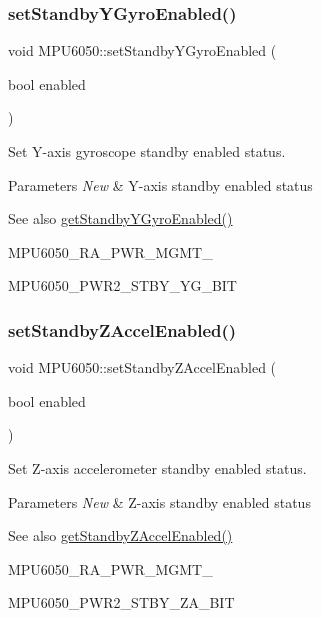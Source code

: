 \subsubsection{\texorpdfstring{setStandbyYGyroEnabled()}{setStandbyYGyroEnabled()}}
{\footnotesize\ttfamily void M\+P\+U6050\+::set\+Standby\+Y\+Gyro\+Enabled (\begin{DoxyParamCaption}\item[{bool}]{enabled }\end{DoxyParamCaption})}

Set Y-\/axis gyroscope standby enabled status. 
\begin{DoxyParams}{Parameters}
{\em New} & Y-\/axis standby enabled status \\
\hline
\end{DoxyParams}
\begin{DoxySeeAlso}{See also}
\mbox{\hyperlink{class_m_p_u6050_aaad2985f8d22aec123f1e1dabcdd427a}{get\+Standby\+Y\+Gyro\+Enabled()}} 

M\+P\+U6050\+\_\+\+R\+A\+\_\+\+P\+W\+R\+\_\+\+M\+G\+M\+T\+\_ 

M\+P\+U6050\+\_\+\+P\+W\+R2\+\_\+\+S\+T\+B\+Y\+\_\+\+Y\+G\+\_\+\+B\+IT 
\end{DoxySeeAlso}
\mbox{\label{class_m_p_u6050_ac5fd917549d2ed0f12b8a17167271199}} 
\subsubsection{\texorpdfstring{setStandbyZAccelEnabled()}{setStandbyZAccelEnabled()}}
{\footnotesize\ttfamily void M\+P\+U6050\+::set\+Standby\+Z\+Accel\+Enabled (\begin{DoxyParamCaption}\item[{bool}]{enabled }\end{DoxyParamCaption})}

Set Z-\/axis accelerometer standby enabled status. 
\begin{DoxyParams}{Parameters}
{\em New} & Z-\/axis standby enabled status \\
\hline
\end{DoxyParams}
\begin{DoxySeeAlso}{See also}
\mbox{\hyperlink{class_m_p_u6050_adae85612e047c4c7f0c3b7110fc92956}{get\+Standby\+Z\+Accel\+Enabled()}} 

M\+P\+U6050\+\_\+\+R\+A\+\_\+\+P\+W\+R\+\_\+\+M\+G\+M\+T\+\_ 

M\+P\+U6050\+\_\+\+P\+W\+R2\+\_\+\+S\+T\+B\+Y\+\_\+\+Z\+A\+\_\+\+B\+IT 
\end{DoxySeeAlso}
\mbox{\label{class_m_p_u6050_ada7c8a873fe157703dcdc08e25b48e32}} 
